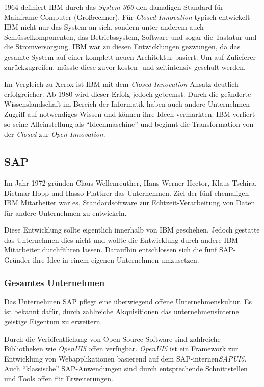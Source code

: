 1964 definiert IBM durch das \textit{System 360} den damaligen Standard für Mainframe-Computer (Großrechner).
Für \textit{Closed Innovation} typisch entwickelt IBM nicht nur das System an sich,
sondern unter anderem auch Schlüsselkomponenten, das Betriebssystem, Software und sogar die Tastatur und die Stromversorgung.
IBM war zu diesen Entwicklungen gezwungen,
da das gesamte System auf einer komplett neuen Architektur basiert.
Um auf Zulieferer zurückzugreifen, müsste diese zuvor kosten- und zeitintensiv geschult werden.

Im Vergleich zu Xerox ist IBM mit dem \textit{Closed Innovation}-Ansatz deutlich erfolgreicher.
Ab 1980 wird dieser Erfolg jedoch gebremst.
Durch die geänderte Wissenslandschaft im Bereich der Informatik haben auch andere Unternehmen
Zugriff auf notwendiges Wissen und können ihre Ideen vermarkten.
IBM verliert so seine Alleinstellung als \enquote{Ideenmaschine}
und beginnt die Transformation von der \textit{Closed} zur \textit{Open Innovation}.


\subsection{SAP}\label{sec:beispiele-sap}
Im Jahr 1972 gründen Claus Wellenreuther, Hans-Werner Hector, Klaus Tschira, Dietmar Hopp und Hasso Plattner das Unternehmen.
Ziel der fünf ehemaligen IBM Mitarbeiter war es,
Standardsoftware zur Echtzeit-\linebreak{}Verarbeitung von Daten für andere Unternehmen zu entwickeln.

Diese Entwicklung sollte eigentlich innerhalb von IBM geschehen.
Jedoch gestatte das Unternehmen dies nicht und wollte die Entwicklung durch andere IBM-Mitarbeiter durchführen lassen.
Daraufhin entschlossen sich die fünf SAP-Gründer ihre Idee in einem eigenen Unternehmen umzusetzen. \cite{SAPCompa72:online}

\subsubsection{Gesamtes Unternehmen}\label{sec:beispiele-sap-gesamt}
Das Unternehmen SAP pflegt eine überwiegend offene Unternehmenskultur.
Es ist bekannt dafür, durch zahlreiche Akquisitionen das unternehmensinterne geistige Eigentum zu erweitern.

Durch die Veröffentlichung von Open-Source-Software sind zahlreiche Bibliotheken wie \textit{OpenUI5} offen verfügbar.
\textit{OpenUI5} ist ein Framework zur Entwicklung von Webapplikationen basierend auf dem SAP-internen\linebreak{}\textit{SAPUI5}.
Auch \enquote{klassische} SAP-Anwendungen sind durch entsprechende Schnittstellen
und Tools offen für Erweiterungen.

